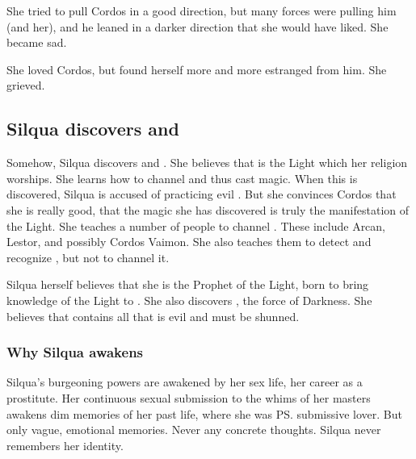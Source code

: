 She tried to pull Cordos in a good direction, but many forces were pulling him (and her), and he leaned in a darker direction that she would have liked. 
She became sad. 

She loved Cordos, but found herself more and more estranged from him. 
She grieved.










\subsection{Silqua discovers \iquin{} and \itzach}
Somehow, Silqua discovers \iquin{} and \nieur{}. 
She believes that \iquin{} is the Light which her religion worships. 
She learns how to channel \iquin{} and thus cast magic. 
When this is discovered, Silqua is accused of practicing evil \dragoncraft. 
But she convinces Cordos that she is really good, that the magic she has discovered is truly the manifestation of the Light. 
She teaches a number of people to channel \iquin{}. 
These include Arcan, Lestor, \Delphine and possibly Cordos Vaimon. 
She also teaches them to detect and recognize \nieur{}, but not to channel it. 

Silqua herself believes that she is the Prophet of the Light, born to bring knowledge of the Light to \Miith{}. She also discovers \nieur{}, the force of Darkness. She believes that \nieur{} contains all that is evil and must be shunned. 





\subsubsection{Why Silqua awakens}
Silqua's burgeoning powers are awakened by her sex life, her career as a prostitute. 
Her continuous sexual submission to the whims of her masters awakens dim memories of her past life, where she was \ps{\Shiaraid} submissive lover. 
But only vague, emotional memories. 
Never any concrete thoughts. 
Silqua never remembers her identity. 

